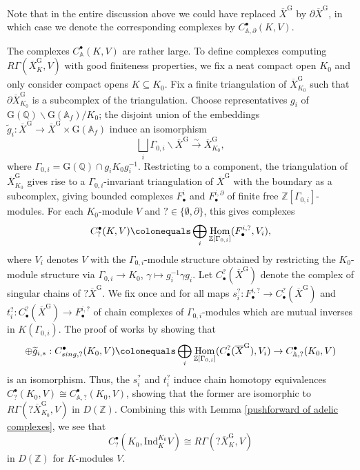 \documentclass{amsart}
\theoremstyle{remark}
\numberwithin{equation}{subsection}
\newcommand{\A}{\AA}
\newcommand{\Q}{\QQ}
\newcommand{\Z}{\ZZ}
\renewcommand{\AA}{{\mathbb A}}
\newcommand{\QQ}{{\mathbb Q}}
\newcommand{\ZZ}{{\mathbb Z}}
\DeclareMathOperator{\Hom}{Hom}
\newcommand{\toisom}{\xrightarrow{\sim}}
\newcommand{\ol}{\overline}
\newcommand{\wt}{\widetilde}
\newcommand{\sub}{\subseteq}
\newcommand{\defeq}{\colonequals}
\renewcommand{\(}{\left(}
\renewcommand{\)}{\right)}
\begin{document}
Note that in the entire discussion above we could have replaced $\ol{X}^\mathrm{G}$ by  $\partial \ol{X}^\mathrm{G}$, 
in which case we denote the corresponding complexes by $C_{\A,\partial}^\bullet(K,V)$. 

The complexes $C_{\A}^\bullet(K,V)$ are rather large. To define complexes computing $R\Gamma(\ol{X}^\mathrm{G}_K,V)$ with good finiteness properties, we fix a neat compact open $K_0$ and only consider compact opens $K \sub K_0$. Fix a finite triangulation of $\ol{X}^\mathrm{G}_{K_0}$ such that $\partial \ol{X}^\mathrm{G}_{K_0}$ is a subcomplex of the triangulation. Choose representatives $g_i$ of $\mathrm{G}(\Q) \backslash \mathrm{G}(\A_f)  / K_0$; the disjoint union of the embeddings $\wt{g}_i : \ol{X}^\mathrm{G} \to \ol{X}^\mathrm{G} \times \mathrm{G}(\A_f)$ induce an isomorphism
\[
\bigsqcup_i \Gamma_{0,i} \backslash \ol{X}^\mathrm{G} \toisom \ol{X}_{K_0}^\mathrm{G},
\]
where $\Gamma_{0,i} = \mathrm{G}(\Q) \cap g_i K_0 g_i^{-1}$. Restricting to a component, the triangulation of $\ol{X}^\mathrm{G}_{K_0}$ gives rise to a $\Gamma_{0,i}$-invariant triangulation of $\ol{X}^\mathrm{G}$ with the boundary as a subcomplex, giving bounded complexes $F_\bullet^i$ and $F_\bullet^{i,\partial}$ of finite free $\Z[\Gamma_{0,i}]$-modules. For each $K_0$-module $V$ and $? \in \{\emptyset,\partial\}$, this gives complexes 
\[
C_{?}^\bullet(K,V) \defeq \bigoplus_i \Hom_{\Z[\Gamma_{0,i}]}(F_\bullet^{i,?},V_i),
\]
where $V_i$ denotes $V$ with the $\Gamma_{0,i}$-module structure obtained by restricting the $K_0$-module structure via $\Gamma_{0,i} \to K_0$, $\gamma \mapsto g_i^{-1}\gamma g_i$. Let $C^?_\bullet(\ol{X}^\mathrm{G})$ denote the complex of singular chains of $?\ol{X}^\mathrm{G}$. We fix once and for all maps $s_i^? : F_\bullet^{i,?} \to C^?_\bullet(\ol{X}^\mathrm{G})$ and $t_i^? : C^?_\bullet(\ol{X}^\mathrm{G}) \to F_\bullet^{i,?}$ of chain complexes of $\Gamma_{0,i}$-modules which are mutual inverses in $K(\Gamma_{0,i})$. The proof of \cite[Proposition 6.2]{khare-thorne} works by showing that
\[
\oplus \wt{g}_{i,\ast} : C_{sing,?}^\bullet(K_0,V) \defeq \bigoplus_i \Hom_{\Z[\Gamma_{0,i}]}(C^?_\bullet(\ol{X}^\mathrm{G}),V_i) \to C^\bullet_{\A,?} (K_0,V)
\]
is an isomorphism. Thus, the $s_i^?$ and $t_i^?$ induce chain homotopy equivalences $C_?^\bullet(K_0,V) \cong C_{\A,?}^\bullet(K_0,V)$, showing that the former are isomorphic to $R\Gamma(?\ol{X}^\mathrm{G}_{K_0},V)$ in $D(\Z)$. Combining this with Lemma \ref{pushforward of adelic complexes}, we see that 
\[
C_?^\bullet(K_0,\mathrm{Ind}_K^{K_0}V)\cong R\Gamma(?\ol{X}^\mathrm{G}_{K},V)
\]
in $D(\Z)$ for $K$-modules $V$. 
\end{document}
